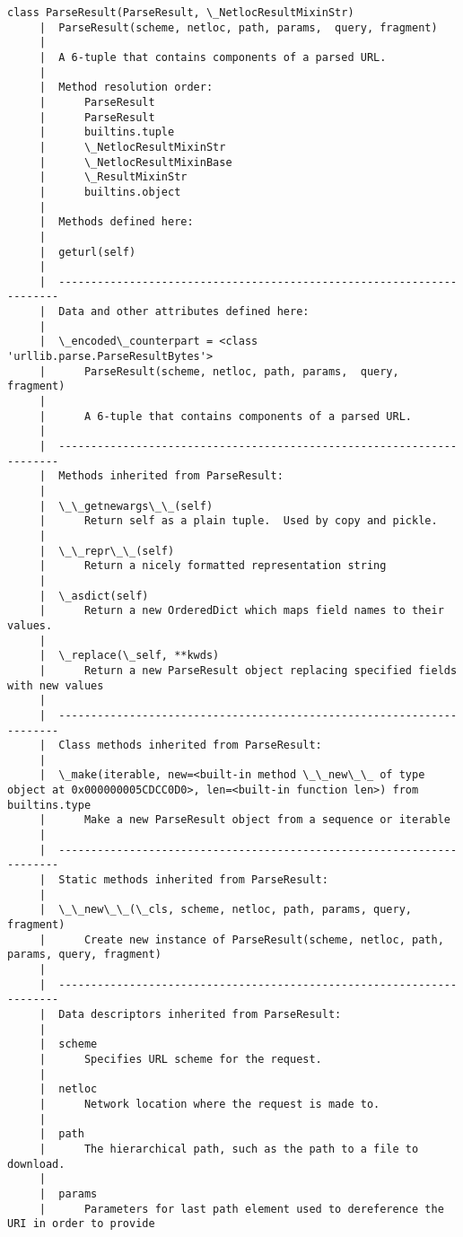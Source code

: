 \documentclass[11pt]{article}
\begin{document}
\begin{Verbatim}[commandchars=\\\{\}]
    class ParseResult(ParseResult, \_NetlocResultMixinStr)
     |  ParseResult(scheme, netloc, path, params,  query, fragment)
     |  
     |  A 6-tuple that contains components of a parsed URL.
     |  
     |  Method resolution order:
     |      ParseResult
     |      ParseResult
     |      builtins.tuple
     |      \_NetlocResultMixinStr
     |      \_NetlocResultMixinBase
     |      \_ResultMixinStr
     |      builtins.object
     |  
     |  Methods defined here:
     |  
     |  geturl(self)
     |  
     |  ----------------------------------------------------------------------
     |  Data and other attributes defined here:
     |  
     |  \_encoded\_counterpart = <class 'urllib.parse.ParseResultBytes'>
     |      ParseResult(scheme, netloc, path, params,  query, fragment)
     |      
     |      A 6-tuple that contains components of a parsed URL.
     |  
     |  ----------------------------------------------------------------------
     |  Methods inherited from ParseResult:
     |  
     |  \_\_getnewargs\_\_(self)
     |      Return self as a plain tuple.  Used by copy and pickle.
     |  
     |  \_\_repr\_\_(self)
     |      Return a nicely formatted representation string
     |  
     |  \_asdict(self)
     |      Return a new OrderedDict which maps field names to their values.
     |  
     |  \_replace(\_self, **kwds)
     |      Return a new ParseResult object replacing specified fields with new values
     |  
     |  ----------------------------------------------------------------------
     |  Class methods inherited from ParseResult:
     |  
     |  \_make(iterable, new=<built-in method \_\_new\_\_ of type object at 0x000000005CDCC0D0>, len=<built-in function len>) from builtins.type
     |      Make a new ParseResult object from a sequence or iterable
     |  
     |  ----------------------------------------------------------------------
     |  Static methods inherited from ParseResult:
     |  
     |  \_\_new\_\_(\_cls, scheme, netloc, path, params, query, fragment)
     |      Create new instance of ParseResult(scheme, netloc, path, params, query, fragment)
     |  
     |  ----------------------------------------------------------------------
     |  Data descriptors inherited from ParseResult:
     |  
     |  scheme
     |      Specifies URL scheme for the request.
     |  
     |  netloc
     |      Network location where the request is made to.
     |  
     |  path
     |      The hierarchical path, such as the path to a file to download.
     |  
     |  params
     |      Parameters for last path element used to dereference the URI in order to provide

\end{Verbatim}
\end{document}
